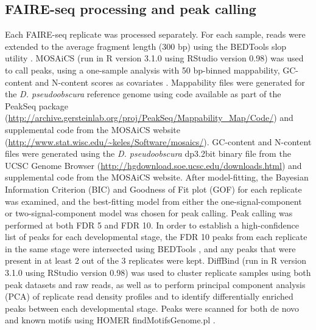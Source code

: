 \subsection{FAIRE-seq processing and peak calling}
Each FAIRE-seq replicate was processed separately. For each sample, reads were extended to the average fragment length (300 bp) using the BEDTools slop utility \citep{quinlan_bedtools:_2010}. MOSAiCS (run in R version 3.1.0 using RStudio version 0.98) was used to call peaks, using a one-sample analysis with 50 bp-binned mappability, GC-content and N-content scores as covariates \citep{mosaics}. Mappability files were generated for the \emph{D. pseudoobscura} reference genome using code available as part of the PeakSeq package (\url{http://archive.gersteinlab.org/proj/PeakSeq/Mappability_Map/Code/}) \citep{rozowsky_peakseq_2009} and supplemental code from the MOSAiCS website (\url{http://www.stat.wisc.edu/~keles/Software/mosaics/}). GC-content and N-content files were generated using the \emph{D. pseudoobscura} dp3.2bit binary file from the UCSC Genome Browser (\url{http://hgdownload.soe.ucsc.edu/downloads.html}) and supplemental code from the MOSAiCS website. After model-fitting, the Bayesian Information Criterion (BIC) and Goodness of Fit plot (GOF) for each replicate was examined, and the best-fitting model from either the one-signal-component or two-signal-component model was chosen for peak calling. Peak calling was performed at both FDR 5 and FDR 10. In order to establish a high-confidence list of peaks for each developmental stage, the FDR 10 peaks from each replicate in the same stage were intersected using BEDTools \citep{quinlan_bedtools:_2010}, and any peaks that were present in at least 2 out of the 3 replicates were kept. DiffBind (run in R version 3.1.0 using RStudio version 0.98) was used to cluster replicate samples using both peak datasets and raw reads, as well as to perform principal component analysis (PCA) of replicate read density profiles and to identify differentially enriched peaks between each developmental stage. Peaks were scanned for both de novo and known motifs using HOMER findMotifsGenome.pl \citep{heinz_simple_2010}.
